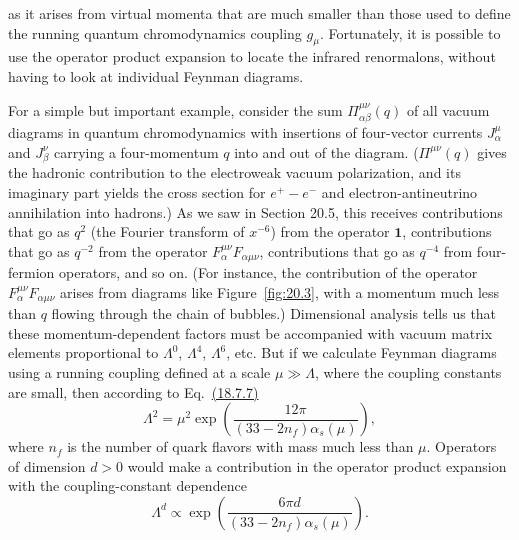 

as it arises from virtual momenta that are much smaller than those used to define the running quantum chromodynamics coupling $g_\mu$. Fortunately, it is possible to use the operator product expansion to locate the infrared renormalons, without having to look at individual Feynman diagrams.

For a simple but important example, consider the sum $\Pi_{\alpha\beta}^{\mu\nu}(q)$ of all vacuum diagrams in quantum chromodynamics with insertions of four-vector currents $J_\alpha^\mu$ and $J_\beta^\nu$ carrying a four-momentum $q$ into and out of the diagram. ($\Pi^{\mu\nu}(q)$ gives the hadronic contribution to the electroweak vacuum polarization, and its imaginary part yields the cross section for $e^+-e^-$ and electron-antineutrino annihilation into hadrons.) As we saw in Section 20.5, this receives contributions that go as $q^2$ (the Fourier transform of $x^{-6}$) from the operator $\mathbf{1}$, contributions that go as $q^{-2}$ from the operator $F_\alpha^{\mu\nu}F_{\alpha\mu\nu}$, contributions that go as $q^{-4}$ from four-fermion operators, and so on. (For instance, the contribution of the operator $F_\alpha^{\mu\nu}F_{\alpha\mu\nu}$ arises from diagrams like Figure~\ref{fig:20.3}, with a momentum much less than $q$ flowing through the chain of bubbles.) Dimensional analysis tells us that these momentum-dependent factors must be accompanied with vacuum matrix elements proportional to $\Lambda^0$, $\Lambda^4$, $\Lambda^6$, etc. But if we calculate Feynman diagrams using a running coupling defined at a scale $\mu\gg\Lambda$, where the coupling constants are small, then according to Eq.~\hyperref[eq:18.7.7]{(18.7.7)}
\begin{equation}
\Lambda^2
=\mu^2\exp\left(
\frac{12\pi}{(33-2n_f)\alpha_s(\mu)}
\right),
\tag{20.7.18}\label{eq:20.7.18}
\end{equation}
where $n_f$ is the number of quark flavors with mass much less than $\mu$. Operators of dimension $d>0$ would make a contribution in the operator product expansion with the coupling-constant dependence
\begin{equation}
\Lambda^d
\propto
\exp\left(
\frac{6\pi d}{(33-2n_f)\alpha_s(\mu)}
\right).
\tag{20.7.19}\label{eq:20.7.19}
\end{equation}

